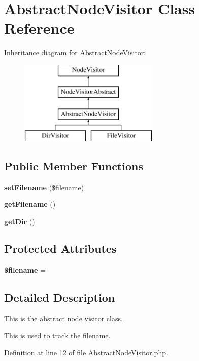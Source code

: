 \section{Abstract\+Node\+Visitor Class Reference}
\label{class_class_preloader_1_1_parser_1_1_abstract_node_visitor}
Inheritance diagram for Abstract\+Node\+Visitor\+:\begin{figure}[H]
\begin{center}
\leavevmode
\includegraphics[height=4.000000cm]{class_class_preloader_1_1_parser_1_1_abstract_node_visitor}
\end{center}
\end{figure}
\subsection*{Public Member Functions}
\begin{DoxyCompactItemize}
\item 
{\bf set\+Filename} (\$filename)
\item 
{\bf get\+Filename} ()
\item 
{\bf get\+Dir} ()
\end{DoxyCompactItemize}
\subsection*{Protected Attributes}
\begin{DoxyCompactItemize}
\item 
{\bf \$filename} = \textquotesingle{}\textquotesingle{}
\end{DoxyCompactItemize}


\subsection{Detailed Description}
This is the abstract node visitor class.

This is used to track the filename. 

Definition at line 12 of file Abstract\+Node\+Visitor.\+php.



